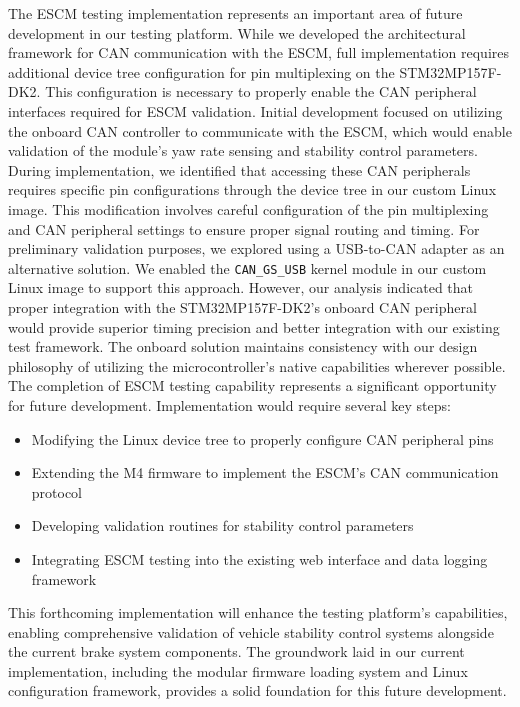 \documentclass[12pt]{article}
\begin{document}
The ESCM testing implementation represents an important area of future development in our testing platform. While we developed the architectural framework for CAN communication with the ESCM, full implementation requires additional device tree configuration for pin multiplexing on the STM32MP157F-DK2. This configuration is necessary to properly enable the CAN peripheral interfaces required for ESCM validation.
Initial development focused on utilizing the onboard CAN controller to communicate with the ESCM, which would enable validation of the module's yaw rate sensing and stability control parameters. During implementation, we identified that accessing these CAN peripherals requires specific pin configurations through the device tree in our custom Linux image. This modification involves careful configuration of the pin multiplexing and CAN peripheral settings to ensure proper signal routing and timing.
For preliminary validation purposes, we explored using a USB-to-CAN adapter as an alternative solution. We enabled the \verb|CAN_GS_USB| kernel module in our custom Linux image to support this approach. However, our analysis indicated that proper integration with the STM32MP157F-DK2's onboard CAN peripheral would provide superior timing precision and better integration with our existing test framework. The onboard solution maintains consistency with our design philosophy of utilizing the microcontroller's native capabilities wherever possible.
The completion of ESCM testing capability represents a significant opportunity for future development. Implementation would require several key steps:
\begin{itemize}
\item Modifying the Linux device tree to properly configure CAN peripheral pins
\item Extending the M4 firmware to implement the ESCM's CAN communication protocol
\item Developing validation routines for stability control parameters
\item Integrating ESCM testing into the existing web interface and data logging framework
\end{itemize}
This forthcoming implementation will enhance the testing platform's capabilities, enabling comprehensive validation of vehicle stability control systems alongside the current brake system components. The groundwork laid in our current implementation, including the modular firmware loading system and Linux configuration framework, provides a solid foundation for this future development.
\end{document}
